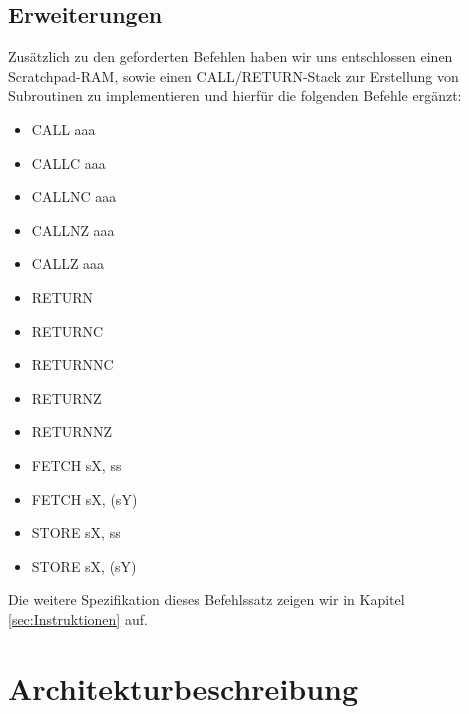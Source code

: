 \documentclass[bibliography=totoc,listof=totoc,index=totoc]{scrartcl}
\begin{document}
\subsection{Erweiterungen}
Zusätzlich zu den geforderten Befehlen haben wir uns entschlossen einen Scratchpad-RAM, sowie einen CALL/RETURN-Stack zur Erstellung von Subroutinen zu implementieren und hierfür die folgenden Befehle ergänzt:
\begin{multicols}{3}
\begin{itemize}
    \item CALL aaa
    \item CALLC aaa
    \item CALLNC aaa
    \item CALLNZ aaa
    \item CALLZ aaa
    \item RETURN
    \item RETURNC
    \item RETURNNC
    \item RETURNZ
    \item RETURNNZ
    \item FETCH sX, ss
    \item FETCH sX, (sY)
    \item STORE sX, ss
    \item STORE sX, (sY)
\end{itemize}
\end{multicols}

Die weitere Spezifikation dieses Befehlssatz zeigen wir in Kapitel \ref{sec:Instruktionen} auf.

\section{Architekturbeschreibung}\label{sec:Architekturbeschreibung}
\end{document}
